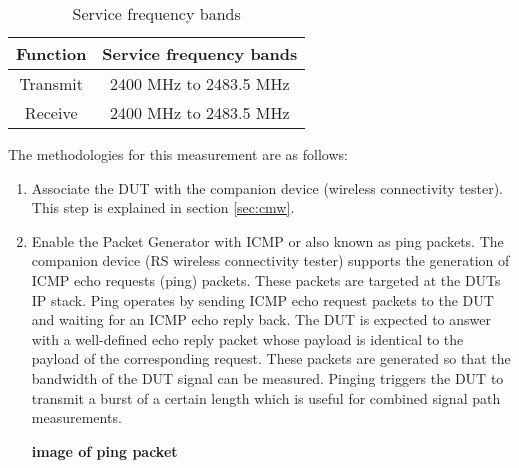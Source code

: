 \begin{table}[ht]
\begin{center}
\begin {tabular} {|c|c|} 
\toprule
Function & Service frequency bands \\ 
\midrule 
Transmit & 2400 MHz to 2483.5 MHz \\
Receive & 2400 MHz to 2483.5 MHz \\
\bottomrule
\end{tabular} 
\caption{Service frequency bands \cite{etsi300328}}
\label{tab:bands}
\end{center}
\end{table}
The methodologies for this measurement are as follows:
\begin{enumerate}
  \item Associate the \acs{DUT} with the companion device (wireless connectivity tester). This step is explained in section \ref{sec:cmw}.
   \item Enable the Packet Generator with \acf{ICMP} or also known as ping packets. The companion device (\acs{RS}\textregistered{} wireless connectivity tester) supports the generation of \acs{ICMP} echo requests (ping) packets. These packets are targeted at the \acsp{DUT} \acs{IP} stack. Ping operates by sending \acs{ICMP} echo request packets to the \acs{DUT} and waiting for an \acs{ICMP} echo reply back. The \acs{DUT} is expected to answer with a well-defined echo reply packet whose payload is identical to the payload of the corresponding request. These packets are generated so that the bandwidth of the \acs{DUT} signal can be measured. Pinging triggers the \acs{DUT} to transmit a burst of a certain length which is useful for combined signal path measurements.

\textbf{image of ping packet}



\end{enumerate}
